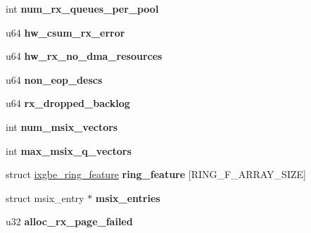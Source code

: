 \begin{DoxyCompactItemize}
\item 
\hypertarget{structixgbe__adapter_a6561a793a661c9f1006caca67b6a5978}{
int {\bfseries num\_\-rx\_\-queues\_\-per\_\-pool}}
\label{structixgbe__adapter_a6561a793a661c9f1006caca67b6a5978}

\item 
\hypertarget{structixgbe__adapter_a6db41669b638c898eb99b89722b1c498}{
u64 {\bfseries hw\_\-csum\_\-rx\_\-error}}
\label{structixgbe__adapter_a6db41669b638c898eb99b89722b1c498}

\item 
\hypertarget{structixgbe__adapter_aaa428b876d61849016a55c0db50102ad}{
u64 {\bfseries hw\_\-rx\_\-no\_\-dma\_\-resources}}
\label{structixgbe__adapter_aaa428b876d61849016a55c0db50102ad}

\item 
\hypertarget{structixgbe__adapter_abbbcceaeffe544a206a159ab08010691}{
u64 {\bfseries non\_\-eop\_\-descs}}
\label{structixgbe__adapter_abbbcceaeffe544a206a159ab08010691}

\item 
\hypertarget{structixgbe__adapter_a080f953f75f43e2896a7f07fe120402d}{
u64 {\bfseries rx\_\-dropped\_\-backlog}}
\label{structixgbe__adapter_a080f953f75f43e2896a7f07fe120402d}

\item 
\hypertarget{structixgbe__adapter_a93e0f8faa0ccde8cfb50468b91f16b26}{
int {\bfseries num\_\-msix\_\-vectors}}
\label{structixgbe__adapter_a93e0f8faa0ccde8cfb50468b91f16b26}

\item 
\hypertarget{structixgbe__adapter_a88521acd138b872d79ff0844eb467a80}{
int {\bfseries max\_\-msix\_\-q\_\-vectors}}
\label{structixgbe__adapter_a88521acd138b872d79ff0844eb467a80}

\item 
\hypertarget{structixgbe__adapter_afb609dc0e2e2d2377b62bbb4506d221c}{
struct \hyperlink{structixgbe__ring__feature}{ixgbe\_\-ring\_\-feature} {\bfseries ring\_\-feature} \mbox{[}RING\_\-F\_\-ARRAY\_\-SIZE\mbox{]}}
\label{structixgbe__adapter_afb609dc0e2e2d2377b62bbb4506d221c}

\item 
\hypertarget{structixgbe__adapter_adcc4850d9e18d66b12b52e2ab7c542c6}{
struct msix\_\-entry $\ast$ {\bfseries msix\_\-entries}}
\label{structixgbe__adapter_adcc4850d9e18d66b12b52e2ab7c542c6}

\item 
\hypertarget{structixgbe__adapter_ac63ba5a436978687ec633c4d58d81907}{
u32 {\bfseries alloc\_\-rx\_\-page\_\-failed}}
\label{structixgbe__adapter_ac63ba5a436978687ec633c4d58d81907}


\end{DoxyCompactItemize}

